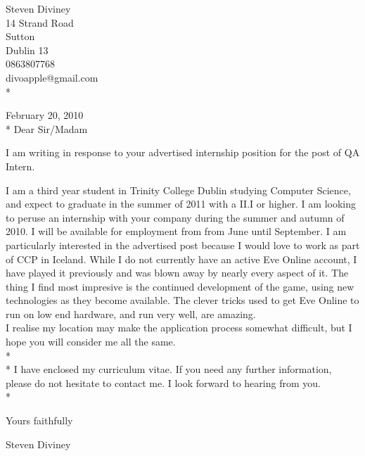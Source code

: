 \documentclass[a4paper,12pt]{article}
\begin{document}
\begin{flushright}
   Steven Diviney \\
   14 Strand Road \\
   Sutton \\
   Dublin 13 \\
   0863807768 \\
   divoapple@gmail.com \\* \vspace{10 mm}
\end{flushright}
\begin{flushleft}
 
February 20, 2010\\*\vspace{10 mm}
Dear Sir/Madam
\end{flushleft}
I am writing in response to your advertised internship position for the post of QA Intern.

I am a third year student in Trinity College Dublin studying Computer Science, and expect to graduate in the summer of 2011 with a II.I or higher.
I am looking to peruse an internship with your company during the summer and autumn of 2010. 
I will be available for employment from from June until September. I am particularly interested in the advertised post because I would love to work as part of CCP in Iceland. 
While I do not currently have an active Eve Online account, I have played it previously and was blown away by nearly every aspect of it. The thing I find most impresive is the continued development of the game, using new technologies as they become available. The clever tricks used to get Eve Online to run on low end hardware, and run very well, are amazing.\\
I realise my location may make the application process somewhat difficult, but I hope you will consider me all the same.
\\*
\\*
I have enclosed my curriculum vitae. If you need any further information, please do not hesitate to contact me. I look forward to hearing from you.\\*

\begin{flushleft}
Yours faithfully\\\vspace{10mm}

Steven Diviney\\
\end{flushleft}
\end{document}
